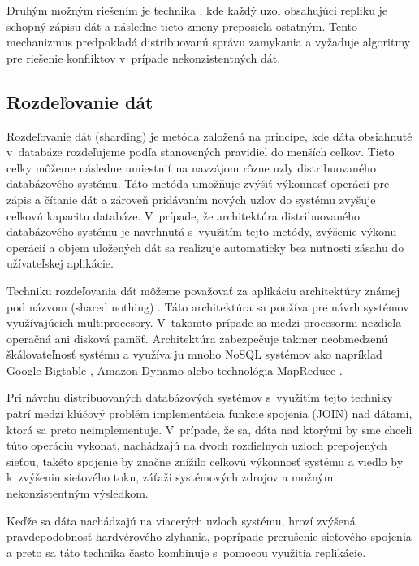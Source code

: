 \documentclass[11pt,twoside,a4paper]{book}
\begin{document}
Druhým možným riešením je technika , kde každý uzol obsahujúci repliku je schopný zápisu dát a následne tieto zmeny preposiela ostatným. Tento mechanizmus predpokladá distribuovanú správu zamykania a vyžaduje algoritmy pre riešenie konfliktov v~prípade nekonzistentných dát.


\subsection{Rozdeľovanie dát}

Rozdeľovanie dát (sharding) je metóda založená na princípe, kde dáta obsiahnuté v~databáze rozdeľujeme podľa stanovených pravidiel do menších celkov. Tieto celky môžeme následne umiestniť na navzájom rôzne uzly distribuovaného databázového systému. Táto metóda umožňuje zvýšiť výkonnosť operácií pre zápis a čítanie dát a zároveň pridávaním nových uzlov do systému zvyšuje celkovú kapacitu databáze. V~prípade, že
architektúra distribuovaného databázového systému je navrhnutá s~využitím tejto metódy, zvýšenie výkonu operácií a objem uložených dát sa realizuje automaticky bez nutnosti zásahu do užívateľskej aplikácie. 

Techniku rozdeľovania dát môžeme považovať za aplikáciu architektúry známej pod názvom  (shared nothing) \cite{stonebraker1986case}. Táto architektúra sa používa pre návrh systémov využívajúcich multiprocesory. V~takomto prípade sa medzi procesormi nezdieľa operačná ani disková pamäť. Architektúra zabezpečuje takmer neobmedzenú škálovateľnosť systému a využíva ju mnoho NoSQL systémov ako napríklad Google Bigtable \cite{chang2008bigtable}, Amazon Dynamo \cite{decandia2007dynamo} alebo technológia MapReduce \cite{dean2008mapreduce}.

Pri návrhu distribuovaných databázových systémov s~využitím tejto techniky patrí medzi kľúčový problém implementácia funkcie spojenia (JOIN) nad dátami, ktorá sa preto neimplementuje. V~prípade, že sa, dáta nad ktorými by sme chceli túto operáciu vykonať, nachádzajú na dvoch rozdielnych uzloch prepojených sieťou, takéto spojenie by značne znížilo celkovú výkonnosť systému a viedlo by k~zvýšeniu sieťového toku, záťaži systémových zdrojov a možným nekonzistentným výsledkom.

Keďže sa dáta nachádzajú na viacerých uzloch systému, hrozí zvýšená pravdepodobnosť hardvérového zlyhania, poprípade prerušenie sieťového spojenia a preto sa táto technika často kombinuje s~pomocou využitia replikácie.
\end{document}
